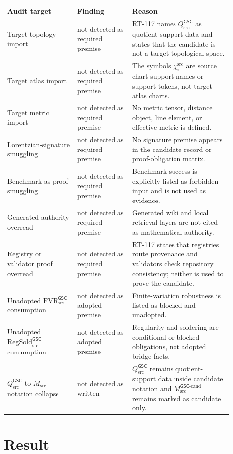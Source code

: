 \documentclass[11pt]{article}
\newcommand{\GSC}{\mathsf{GSC}}
\newcommand{\Msrc}{M_{\mathrm{src}}}
\newcommand{\Qsrc}{Q_{\mathrm{src}}}
\begin{document}
\begin{longtable}{|p{0.28\linewidth}|p{0.22\linewidth}|p{0.40\linewidth}|}
\hline
\textbf{Audit target} & \textbf{Finding} & \textbf{Reason} \\
\hline
Target topology import & not detected as required premise & RT-117 names
\(\Qsrc^{\GSC}\) as quotient-support data and states that the candidate is not
a target topological space. \\
\hline
Target atlas import & not detected as required premise & The symbols
\(\chi_i^{\mathrm{src}}\) are source chart-support names or support tokens, not
target atlas charts. \\
\hline
Target metric import & not detected as required premise & No metric tensor,
distance object, line element, or effective metric is defined. \\
\hline
Lorentzian-signature smuggling & not detected as required premise & No
signature premise appears in the candidate record or proof-obligation matrix. \\
\hline
Benchmark-as-proof smuggling & not detected as required premise & Benchmark
success is explicitly listed as forbidden input and is not used as evidence. \\
\hline
Generated-authority overread & not detected as required premise & Generated
wiki and local retrieval layers are not cited as mathematical authority. \\
\hline
Registry or validator proof overread & not detected as required premise &
RT-117 states that registries route provenance and validators check repository
consistency; neither is used to prove the candidate. \\
\hline
Unadopted \(\mathrm{FVR}_{\mathrm{src}}^{\GSC}\) consumption & not detected as
adopted premise & Finite-variation robustness is listed as blocked and
unadopted. \\
\hline
Unadopted \(\mathrm{RegSold}_{\mathrm{src}}^{\GSC}\) consumption & not detected
as adopted premise & Regularity and soldering are conditional or blocked
obligations, not adopted bridge facts. \\
\hline
\(\Qsrc^{\GSC}\)-to-\(\Msrc\) notation collapse & not detected as written &
\(\Qsrc^{\GSC}\) remains quotient-support data inside candidate notation and
\(\Msrc^{\GSC\mbox{-}\mathrm{cand}}\) remains marked as candidate only. \\
\hline
\end{longtable}

\section{Result}
\end{document}
